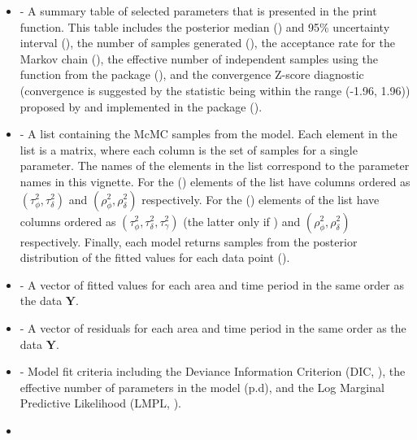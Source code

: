 \documentclass[article,shortnames,nojss]{jss}
\begin{document}
\begin{itemize}
\item {} - A summary table of selected parameters that is presented in the print function. This table includes the posterior median () and 95$\%$ uncertainty interval (), the number of samples generated (), the acceptance rate for the Markov chain (), the effective number of independent samples using the function  from the  package (), and the convergence Z-score diagnostic (convergence is suggested by the statistic being within the range (-1.96, 1.96)) proposed by \cite{geweke1992} and implemented in the  package ().

\item {} - A list containing the McMC samples from the model. Each element in the list is a matrix, where each column is the set of samples for a single parameter. The names of the elements in the list correspond to the parameter names in this vignette. For  the () elements of the list have columns ordered as $(\tau^2_{\phi}, \tau^2_{\delta})$ and $(\rho^2_{\phi}, \rho^2_{\delta})$ respectively. For   the () elements of the list have columns ordered as $(\tau^2_{\phi}, \tau^2_{\delta}, \tau^2_{\gamma})$ (the latter only if ) and $(\rho^2_{\phi}, \rho^2_{\delta})$ respectively. Finally, each model returns samples from the posterior distribution of the fitted values for each data point ().

\item {} - A vector of fitted values for each area and time period in the same order as the data $\mathbf{Y}$.

\item {} - A vector of residuals for each area and time period in the same order as the data $\mathbf{Y}$.

\item {} - Model fit criteria including the Deviance Information Criterion (DIC, \cite{spiegelhalter2002}), the effective number of parameters in the model (p.d), and the Log Marginal Predictive Likelihood (LMPL, \cite{congdon2005}).

\item {}


\end{itemize}
\end{document}

